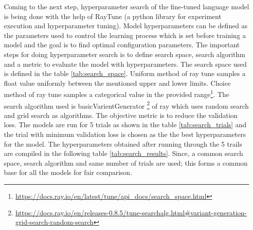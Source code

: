 Coming to the next step, hyperparameter search of the fine-tuned language model is being done with the help of RayTune (a python library for experiment execution and hyperparameter tuning). Model hyperparameters can be defined as the parameters used to control the learning process which is set before training a model \cite{bergstra2012random} and the goal is to find optimal configuration parameters. The important steps for doing hyperparameter search is to define search space, search algorithm and a metric to evaluate the model with hyperparameters. The search space used is defined in the table \ref{tab:search_space}. Uniform method of ray tune samples a float value uniformly between the mentioned upper and lower limits. Choice method of ray tune samples a categorical value in the provided range\footnote{\url{https://docs.ray.io/en/latest/tune/api_docs/search_space.html}}. The search algorithm used is basicVarientGenerator \footnote{\url{https://docs.ray.io/en/releases-0.8.5/tune-searchalg.html#variant-generation-grid-search-random-search}} of ray which uses random search and grid search as algorithms. The objective metric is to reduce the validation loss. The models are run for 5 trials as shown in the table \ref{tab:search_trials} and the trial with minimum validation loss is chosen as the  the best hyperparameters for the model.  The hyperparameters obtained after running through the 5 trails are compiled in the following table \ref{tab:search_results}. Since, a common search space, search algorithm and same number of trials are used; this forms a common base for all the models for fair comparison.

